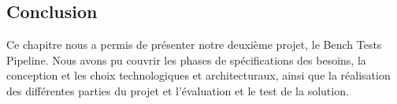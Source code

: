 \begin{spacing}{1.2}
\section*{Conclusion}
Ce chapitre nous a permis de présenter notre deuxième projet, le Bench Tests Pipeline. Nous avons pu couvrir les phases de spécifications des besoins, la conception et les choix technologiques et architecturaux, ainsi que la réalisation des différentes parties du projet et l'évaluation et le test de la solution.

\end{spacing}